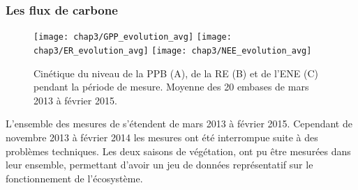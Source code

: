 


\subsubsection{Les flux de carbone}

\begin{figure}
	\centering
	\texttt{[image: chap3/GPP\_evolution\_avg]}
	\texttt{[image: chap3/ER\_evolution\_avg]}
	\texttt{[image: chap3/NEE\_evolution\_avg]}
%	
%	
\caption{Cinétique du niveau de la PPB (A), de la RE (B) et de l'ENE (C) pendant la période de mesure. Moyenne des 20 embases de mars 2013 à février 2015.}
\label{fig:flux_evolution_avg}
\end{figure}

L'ensemble des mesures de \coo s'étendent de mars 2013 à février 2015.
Cependant de novembre 2013 à février 2014 les mesures ont été interrompue suite à des problèmes techniques.
Les deux saisons de végétation, ont pu être mesurées dans leur ensemble, permettant d'avoir un jeu de données représentatif sur le fonctionnement de l'écosystème.

